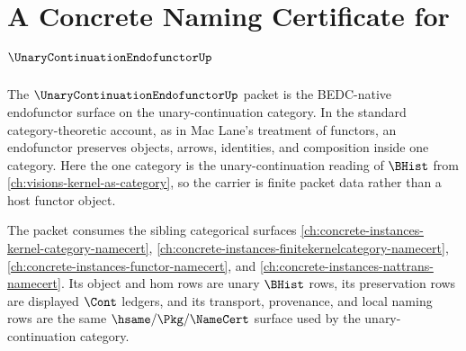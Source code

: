 \chapter{A Concrete Naming Certificate for $\UnaryContinuationEndofunctorUp$}
\label{ch:concrete-instances-unary-continuation-endofunctor-namecert}

The $\UnaryContinuationEndofunctorUp$ packet is the BEDC-native endofunctor
surface on the unary-continuation category. In the standard category-theoretic
account, as in Mac Lane's treatment of functors, an endofunctor preserves
objects, arrows, identities, and composition inside one category. Here the one
category is the unary-continuation reading of $\BHist$ from
\autoref{ch:visions-kernel-as-category}, so the carrier is finite packet data
rather than a host functor object.

The packet consumes the sibling categorical surfaces
\autoref{ch:concrete-instances-kernel-category-namecert},
\autoref{ch:concrete-instances-finitekernelcategory-namecert},
\autoref{ch:concrete-instances-functor-namecert}, and
\autoref{ch:concrete-instances-nattrans-namecert}. Its object and hom rows are
unary $\BHist$ rows, its preservation rows are displayed $\Cont$ ledgers, and
its transport, provenance, and local naming rows are the same
$\hsame/\Pkg/\NameCert$ surface used by the unary-continuation category.


